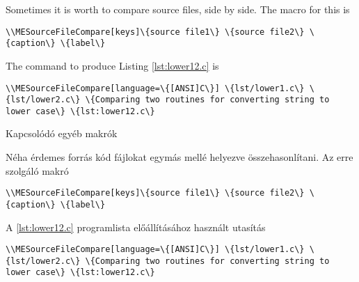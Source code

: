 {
Sometimes it is worth to compare source files, side by side.
The macro for this is
\par\noindent\lstinline|\\MESourceFileCompare[keys]\{source file1\} \{source file2\} \{caption\} \{label\}|
\par\noindent The command to produce Listing \ref{lst:lower12.c} is
\par\noindent\lstinline|\\MESourceFileCompare[language=\{[ANSI]C\}] \{lst/lower1.c\} \{lst/lower2.c\} \{Comparing two routines for converting string to lower case\} \{lst:lower12.c\}|


%
}
{Kapcsolódó egyéb makrók}
{
Néha érdemes forrás kód fájlokat egymás mellé helyezve összehasonlítani.
Az erre szolgáló makró
\par\noindent\lstinline|\\MESourceFileCompare[keys]\{source file1\} \{source file2\} \{caption\} \{label\}|
\par\noindent A \ref{lst:lower12.c} programlista előállításához használt
utasítás
\par\noindent\lstinline|\\MESourceFileCompare[language=\{[ANSI]C\}] \{lst/lower1.c\} \{lst/lower2.c\} \{Comparing two routines for converting string to lower case\} \{lst:lower12.c\}|


}


